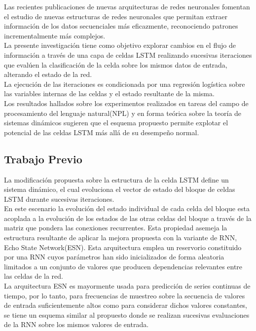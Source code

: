 \documentclass{article}
\begin{document}
	Las recientes publicaciones de nuevas arquitecturas de redes neuronales \cite{1GANs}\cite{18DifferentiableNeuralComputer} fomentan el estudio de nuevas estructuras de redes neuronales que permitan extraer información de los datos secuenciales más eficazmente, reconociendo patrones incrementalmente más complejos.\\
	
	La presente investigación tiene como objetivo explorar cambios en el flujo de información a través de una capa de celdas LSTM realizando sucesivas iteraciones que evalúen la clasificación de la celda sobre los mismos datos de entrada, alterando el estado de la red. \\
	La ejecución de las iteraciones es condicionada por una regresión logística sobre las variables internas de las celdas y el estado resultante de la misma.\\
	Los resultados hallados sobre los experimentos realizados en tareas del campo de procesamiento del lenguaje natural(NPL) y en forma teórica sobre la teoría de sistemas dinámicos sugieren que el esquema propuesto permite explotar el potencial de las celdas LSTM más allá de su desempeño normal.
	
	\subsection{Trabajo Previo}
	La modificación propuesta sobre la estructura de la celda LSTM define un sistema dinámico, el cual evoluciona el vector de estado del bloque de celdas LSTM durante sucesivas iteraciones. \\
	En este escenario la evolución del estado individual de cada celda del bloque esta acoplada a la evolución de los estados de las otras celdas del bloque a través de la matriz que pondera las conexiones recurrentes. Esta propiedad asemeja la estructura resultante de aplicar la mejora propuesta con la variante de RNN, Echo State Network(ESN). Esta arquitectura emplea un reservorio constituido por una RNN cuyos parámetros han sido inicializados de forma aleatoria limitados a un conjunto de valores que producen dependencias relevantes entre las celdas de la red.\\
	La arquitectura ESN es mayormente usada para predicción de series continuas de tiempo, por lo tanto, para frecuencias de muestreo sobre la secuencia de valores de entrada suficientemente altos como para considerar dichos valores constantes, se tiene un esquema similar al propuesto donde se realizan sucesivas evaluaciones de la RNN sobre los mismos valores de entrada.\\
	
\end{document}
